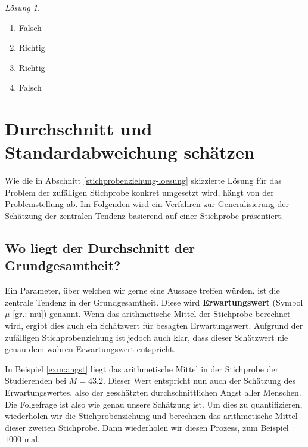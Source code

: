 \documentclass[
]{book}
\providecommand{\tightlist}{%
  \setlength{\itemsep}{0pt}\setlength{\parskip}{0pt}}
\theoremstyle{definition}
\theoremstyle{definition}
\theoremstyle{definition}
\theoremstyle{definition}
\theoremstyle{remark}
\newtheorem*{solution}{Lösung}
\begin{document}
\begin{solution}
\leavevmode

\begin{enumerate}
\def\labelenumi{\alph{enumi})}
\tightlist
\item
  Falsch
\item
  Richtig
\item
  Richtig
\item
  Falsch
\end{enumerate}

\end{solution}

\chapter{Durchschnitt und Standardabweichung schätzen}\label{durchschnitt-und-standardabweichung-schuxe4tzen}

Wie die in Abschnitt \ref{stichprobenziehung-loesung} skizzierte Lösung für das Problem der zufälligen Stichprobe konkret umgesetzt wird, hängt von der Problemstellung ab. Im Folgenden wird ein Verfahren zur Generalisierung der Schätzung der zentralen Tendenz
basierend auf einer Stichprobe präsentiert.

\section{Wo liegt der Durchschnitt der Grundgesamtheit?}\label{wo-liegt-der-durchschnitt-der-grundgesamtheit}

Ein Parameter, über welchen wir gerne eine Aussage treffen würden, ist die zentrale Tendenz in der Grundgesamtheit. \label{customdef-erwartungswert}{Diese wird \textbf{Erwartungswert} (Symbol \(\mu\) {[}gr.: mü{]}) genannt.} Wenn das arithmetische Mittel der Stichprobe berechnet wird, ergibt dies auch ein Schätzwert für besagten Erwartungswert. Aufgrund der zufälligen Stichprobenziehung ist jedoch auch klar, dass dieser Schätzwert nie genau dem wahren Erwartungswert entspricht.

In Beispiel \ref{exm:angst} liegt das arithmetische Mittel in der Stichprobe der Studierenden bei \(M=43.2\). Dieser Wert entspricht nun auch der Schätzung des Erwartungswertes, also der geschätzten durchschnittlichen Angst aller Menschen. Die Folgefrage ist also wie genau unsere Schätzung ist. Um dies zu quantifizieren, wiederholen wir die Stichprobenziehung und berechnen das arithmetische Mittel dieser zweiten Stichprobe. Dann wiederholen wir diesen Prozess, zum Beispiel \(1000\) mal.
\end{document}
